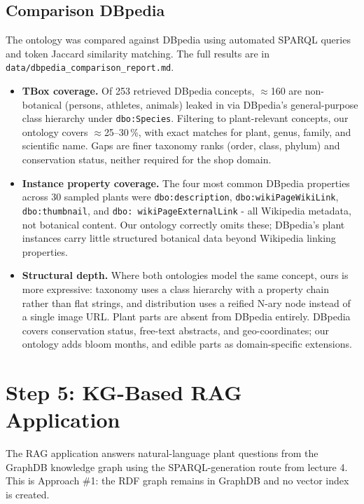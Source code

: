\documentclass[11pt,a4paper]{article}
\newcommand{\artifact}[1]{\texttt{#1}}
\begin{document}
\subsection{Comparison DBpedia}


The ontology was compared against DBpedia using automated SPARQL queries
and token Jaccard similarity matching. The full results are in
\artifact{data/dbpedia\_comparison\_report.md}.

\begin{itemize}
  \item \textbf{TBox coverage.}
    Of 253 retrieved DBpedia concepts, $\approx$160 are non-botanical
    (persons, athletes, animals) leaked in via DBpedia's general-purpose
    class hierarchy under \texttt{dbo:Species}.
    Filtering to plant-relevant concepts, our ontology covers $\approx$25--30\,\%,
    with exact matches for plant, genus, family, and scientific name.
    Gaps are finer taxonomy ranks (order, class, phylum) and conservation
    status, neither required for the shop domain.

  \item \textbf{Instance property coverage.}
    The four most common DBpedia properties across 30 sampled plants were
    \texttt{dbo:description}, \texttt{dbo:wikiPageWikiLink},
    \texttt{dbo:thumbnail}, and \texttt{dbo: wikiPageExternalLink} -
    all Wikipedia metadata, not botanical content.
    Our ontology correctly omits these; DBpedia's plant instances carry
    little structured botanical data beyond Wikipedia linking properties.

  \item \textbf{Structural depth.}
    Where both ontologies model the same concept, ours is more expressive:
    taxonomy uses a class hierarchy with a property chain rather than flat
    strings, and distribution uses a reified N-ary node instead of a single
    image URL. Plant parts are absent from DBpedia entirely.
    DBpedia covers conservation status, free-text abstracts, and
    geo-coordinates; our ontology adds bloom months, and
    edible parts as domain-specific extensions.
\end{itemize}


\section{Step 5: KG-Based RAG Application}

The RAG application answers natural-language plant questions from the GraphDB
knowledge graph using the SPARQL-generation route from lecture 4. This is
Approach \#1: the RDF graph remains in GraphDB and no vector index is created.
\end{document}
